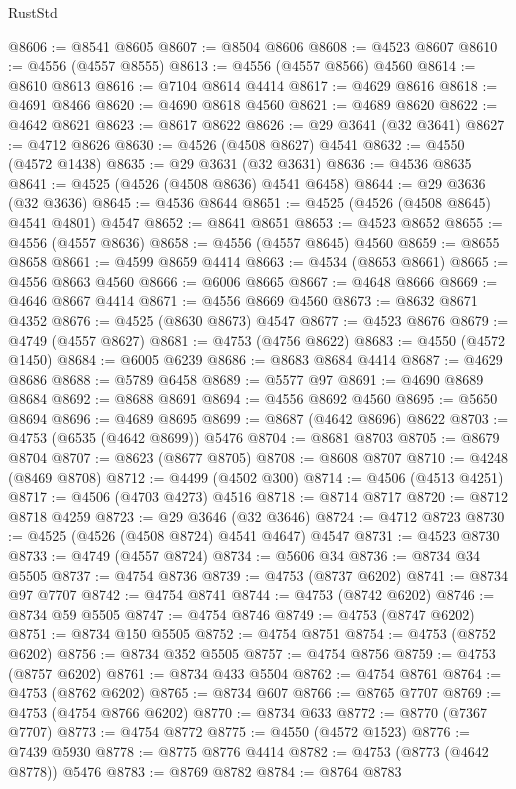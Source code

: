 \begin{lexlean}{RustStd}
\begin{coremodule}
@8606 := @8541 @8605
@8607 := @8504 @8606
@8608 := @4523 @8607
@8610 := @4556 (@4557 @8555)
@8613 := @4556 (@4557 @8566) @4560
@8614 := @8610 @8613
@8616 := @7104 @8614 @4414
@8617 := @4629 @8616
@8618 := @4691 @8466
@8620 := @4690 @8618 @4560
@8621 := @4689 @8620
@8622 := @4642 @8621
@8623 := @8617 @8622
@8626 := @29 @3641 (@32 @3641)
@8627 := @4712 @8626
@8630 := @4526 (@4508 @8627) @4541
@8632 := @4550 (@4572 @1438)
@8635 := @29 @3631 (@32 @3631)
@8636 := @4536 @8635
@8641 := @4525 (@4526 (@4508 @8636) @4541 @6458)
@8644 := @29 @3636 (@32 @3636)
@8645 := @4536 @8644
@8651 := @4525 (@4526 (@4508 @8645) @4541 @4801) @4547
@8652 := @8641 @8651
@8653 := @4523 @8652
@8655 := @4556 (@4557 @8636)
@8658 := @4556 (@4557 @8645) @4560
@8659 := @8655 @8658
@8661 := @4599 @8659 @4414
@8663 := @4534 (@8653 @8661)
@8665 := @4556 @8663 @4560
@8666 := @6006 @8665
@8667 := @4648 @8666
@8669 := @4646 @8667 @4414
@8671 := @4556 @8669 @4560
@8673 := @8632 @8671 @4352
@8676 := @4525 (@8630 @8673) @4547
@8677 := @4523 @8676
@8679 := @4749 (@4557 @8627)
@8681 := @4753 (@4756 @8622)
@8683 := @4550 (@4572 @1450)
@8684 := @6005 @6239
@8686 := @8683 @8684 @4414
@8687 := @4629 @8686
@8688 := @5789 @6458
@8689 := @5577 @97
@8691 := @4690 @8689 @8684
@8692 := @8688 @8691
@8694 := @4556 @8692 @4560
@8695 := @5650 @8694
@8696 := @4689 @8695
@8699 := @8687 (@4642 @8696) @8622
@8703 := @4753 (@6535 (@4642 @8699)) @5476
@8704 := @8681 @8703
@8705 := @8679 @8704
@8707 := @8623 (@8677 @8705)
@8708 := @8608 @8707
@8710 := @4248 (@8469 @8708)
@8712 := @4499 (@4502 @300)
@8714 := @4506 (@4513 @4251)
@8717 := @4506 (@4703 @4273) @4516
@8718 := @8714 @8717
@8720 := @8712 @8718 @4259
@8723 := @29 @3646 (@32 @3646)
@8724 := @4712 @8723
@8730 := @4525 (@4526 (@4508 @8724) @4541 @4647) @4547
@8731 := @4523 @8730
@8733 := @4749 (@4557 @8724)
@8734 := @5606 @34
@8736 := @8734 @34 @5505
@8737 := @4754 @8736
@8739 := @4753 (@8737 @6202)
@8741 := @8734 @97 @7707
@8742 := @4754 @8741
@8744 := @4753 (@8742 @6202)
@8746 := @8734 @59 @5505
@8747 := @4754 @8746
@8749 := @4753 (@8747 @6202)
@8751 := @8734 @150 @5505
@8752 := @4754 @8751
@8754 := @4753 (@8752 @6202)
@8756 := @8734 @352 @5505
@8757 := @4754 @8756
@8759 := @4753 (@8757 @6202)
@8761 := @8734 @433 @5504
@8762 := @4754 @8761
@8764 := @4753 (@8762 @6202)
@8765 := @8734 @607
@8766 := @8765 @7707
@8769 := @4753 (@4754 @8766 @6202)
@8770 := @8734 @633
@8772 := @8770 (@7367 @7707)
@8773 := @4754 @8772
@8775 := @4550 (@4572 @1523)
@8776 := @7439 @5930
@8778 := @8775 @8776 @4414
@8782 := @4753 (@8773 (@4642 @8778)) @5476
@8783 := @8769 @8782
@8784 := @8764 @8783

\end{coremodule}
\end{lexlean}
